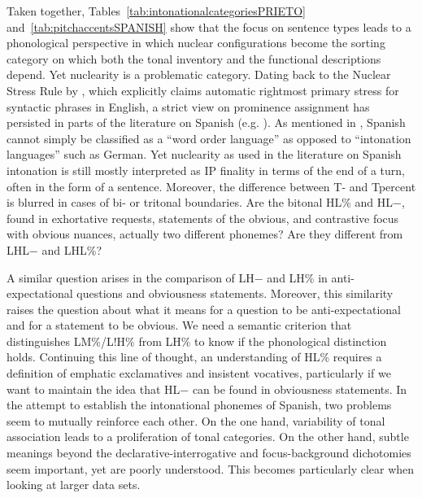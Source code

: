 Taken together, Tables~\ref{tab:intonationalcategoriesPRIETO} and~\ref{tab:pitchaccentsSPANISH} show that the focus on sentence types leads to a phonological perspective in which nuclear configurations become the sorting category on which both the tonal inventory and the functional descriptions depend. Yet nuclearity is a problematic category. Dating back to the Nuclear Stress Rule by \citet[17]{ChomskyHalle.1968}, which explicitly claims automatic rightmost primary stress for syntactic phrases in English, a strict view on prominence assignment has persisted in parts of the literature on Spanish (e.g. \cite{Zubizarreta.2016}). As mentioned in , Spanish cannot simply be classified as a ``word order language'' as opposed to ``intonation languages'' such as German. Yet nuclearity as used in the literature on Spanish intonation is still mostly interpreted as \ac{IP} finality in terms of the end of a turn, often in the form of a sentence. Moreover, the difference between \ac{T-} and \ac{Tpercent} is blurred in cases of bi- or tritonal boundaries. Are the bitonal HL\% and HL$-$, found in exhortative requests, statements of the obvious, and contrastive focus with obvious nuances, actually two different phonemes? Are they different from LHL$-$ and LHL\%? 

A similar question arises in the comparison of LH$-$ and LH\% in anti-ex\-pec\-ta\-tio\-nal questions and obviousness statements. Moreover, this similarity raises the question about what it means for a question to be anti-expectational and for a statement to be obvious. We need a semantic criterion that distinguishes LM\%/L!H\% from LH\% to know if the phonological distinction holds. Continuing this line of thought, an understanding of HL\% requires a definition of emphatic exclamatives and insistent vocatives, particularly if we want to maintain the idea that HL$-$ can be found in obviousness statements. In the attempt to establish the intonational phonemes of Spanish, two problems seem to mutually reinforce each other. On the one hand, variability of tonal association leads to a proliferation of tonal categories. On the other hand, subtle meanings beyond the declarative-interrogative and focus-background dichotomies seem important, yet are poorly understood. This becomes particularly clear when looking at larger data sets.

